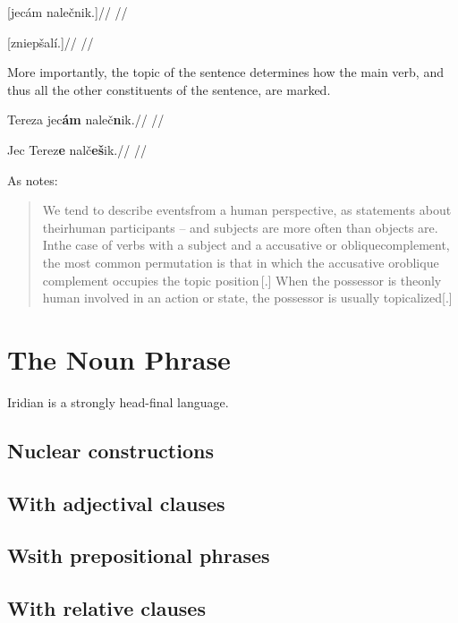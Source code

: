 \a
\begingl
\gla \relax[Tereza] [jecám nalečnik.]//
\glft {}//
\endgl

\a
\begingl
\gla \relax[Shléd] [zniepšalí.]//
\glft {}//
\endgl

\xe


More importantly, the topic of the sentence determines how the main verb, and thus all the other constituents of the sentence, are marked.

\pex
\a
\begingl
\gla Tereza jec\textbf{ám} naleč\textbf{n}ik.//
\glft {}//
\endgl

\a
\begingl
\gla Jec Terez\textbf{e} nalč\textbf{eš}ik.//
\glft {}//
\endgl

\xe

As \textcite[9]{kiss2004} notes:

\begin{quote}
  We tend to describe eventsfrom a human perspective, as statements about theirhuman participants – and subjects are more often {\sc[+human]} than objects are. Inthe case of verbs with a {\sc[–human]} subject and a {\sc[+human]} accusative or obliquecomplement,  the  most  common  permutation  is  that  in  which  the  accusative  oroblique complement occupies the topic position\,[.] When the possessor is theonly human involved in an action or state, the possessor is usually topicalized[.]
\end{quote}

\section{The Noun Phrase}

Iridian is a strongly head-final language.

\subsection{Nuclear constructions}
\subsection{With adjectival clauses}
\subsection{Wsith prepositional phrases}
\subsection{With relative clauses}

